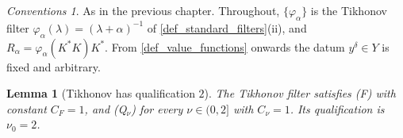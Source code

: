 \documentclass[a4paper]{report}
\theoremstyle{plain}
\newtheorem{lemma}[theorem]{Lemma}
\theoremstyle{definition}
\theoremstyle{remark}
\newtheorem{assumptions}[theorem]{Conventions}
\begin{document}
\begin{assumptions}
  \label{asm_tikhonov_regularization}
  As in the previous chapter.  Throughout,
$\{\varphi_{\alpha}\}$ is the Tikhonov filter $\varphi_{\alpha}(\lambda) =
(\lambda+\alpha)^{-1}$ of \cref{def_standard_filters}(ii), and
$R_{\alpha} = \varphi_{\alpha}(K^{*}K)K^{*}$.  From \cref{def_value_functions} onwards
the datum $y^{\delta} \in Y$ is fixed and arbitrary.
\end{assumptions}

\begin{lemma}[Tikhonov has qualification $2$]
  \label{lem_tikhonov_qualification}
  The Tikhonov filter satisfies (F) with constant $C_F = 1$, and (Q$_{\nu}$) for every
  $\nu \in (0,2]$ with $C_{\nu} = 1$.  Its qualification is $\nu_0 = 2$.
\end{lemma}
\end{document}
